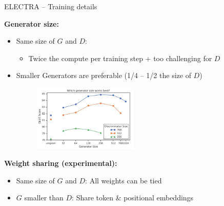 \begin{frame}{ELECTRA -- Training details}

\vfill

	\textbf{Generator size:}

	\begin{itemize}
		\item Same size of $G$ and $D$: 
			\begin{itemize}
				\item Twice the compute per training step + too challenging for $D$
			\end{itemize}
		\item Smaller Generators are preferable (1/4 -- 1/2 the size of $D$)
	\begin{figure}
		\centering
		\includegraphics[width = 5cm]{figure/61-electra-size-g.png}\\ 
	\end{figure}
	\end{itemize}
	
	\textbf{Weight sharing (experimental):}

	\begin{itemize}
		\item Same size of $G$ and $D$: All weights can be tied
		\item $G$ smaller than $D$: Share token \& positional embeddings 
	\end{itemize}
	
\vfill

\end{frame}


